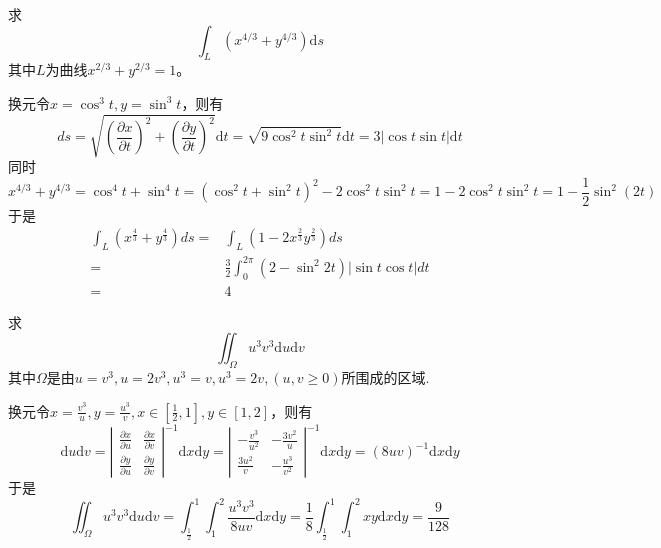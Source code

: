 \begin{exercise}
    求
    \[\int_L\left(x^{4/3}+y^{4/3}\right)\mathrm{d}s\]
    其中$L$为曲线$x^{2/3}+y^{2/3}=1$。
\end{exercise}
\begin{solution}
    换元令$x=\cos^3t,y=\sin^3t$，则有
    \[
        ds=\sqrt{\left(\frac{\partial x}{\partial t}\right)^2+\left(\frac{\partial y}{\partial t}\right)^2}\mathrm{d}t=\sqrt{9\cos^2t\sin^2t}\mathrm{d}t=3|\cos t\sin t|\mathrm{d}t
    \]
    同时
    \[
        x^{4/3}+y^{4/3}=\cos^4t+\sin^4t=\left(\cos^2t+\sin^2t\right)^2-2\cos^2t\sin^2t=1-2\cos^2t\sin^2t=1-\frac{1}{2}\sin^2(2t)
    \]
    于是
    \begin{align*}
        \int_L\left(x^{\frac{4}{3}}+y^{\frac{4}{3}}\right) d s= &\int_L\left(1-2 x^{\frac{2}{3}} y^{\frac{2}{3}}\right) d s \\
        = & \frac{3}{2} \int_0^{2 \pi}\left(2-\sin ^2 2 t\right)|\sin t \cos t| d t \\
        = & 4
    \end{align*}
\end{solution}
\begin{exercise}
    求
    \[
        \iint_\Omega u^3v^3\mathrm{d}u\mathrm{d}v
    \]
    其中$\Omega$是由$u=v^3,u=2v^3,u^3=v,u^3=2v,(u,v\ge 0)$所围成的区域.
\end{exercise}
\begin{solution}
    换元令$x=\frac{v^3}{u},y=\frac{u^3}{v},x\in[\frac{1}{2},1],y\in[1,2]$，则有
    \[
        \mathrm{d}u\mathrm{d}v=\left|\begin{array}{cc}
        \frac{\partial x}{\partial u}&\frac{\partial x}{\partial v}\\
        \frac{\partial y}{\partial u}&\frac{\partial y}{\partial v}
        \end{array}\right|^{-1}\mathrm{d}x\mathrm{d}y=\left|\begin{array}{cc}
        -\frac{v^3}{u^2}&-\frac{3v^2}{u}\\
        \frac{3u^2}{v}&-\frac{u^3}{v^2}
        \end{array}\right|^{-1}\mathrm{d}x\mathrm{d}y=(8uv)^{-1}\mathrm{d}x\mathrm{d}y
    \]
    于是
    \[
        \iint_\Omega u^3v^3\mathrm{d}u\mathrm{d}v=\int_{\frac{1}{2}}^1\int_1^2\frac{u^3v^3}{8uv}\mathrm{d}x\mathrm{d}y=\frac{1}{8}\int_{\frac{1}{2}}^1\int_1^2 xy\mathrm{d}x\mathrm{d}y=\frac{9}{128}
    \]
\end{solution}

